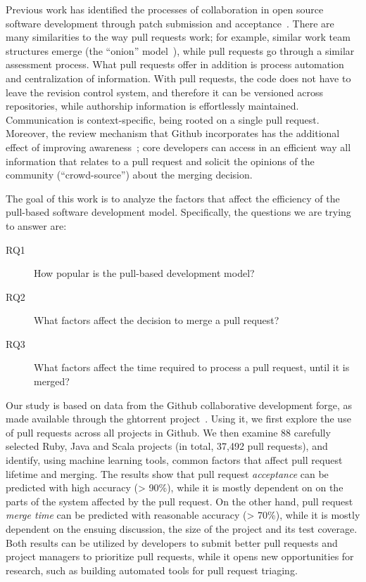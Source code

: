 \documentclass{acm_proc_article-sp}
\begin{document}
Previous work has identified the processes of collaboration in open source
software development through patch submission and acceptance~\cite{MOCKU02,
Bird07, Weiss08}. There are many similarities to the way pull requests work; for
example, similar work team structures emerge (the ``onion''
model~\cite{Crows05}), while pull requests go through a similar assessment
process. What pull requests offer in addition is process automation and
centralization of information. With pull requests, the code does not have to
leave the revision control system, and therefore it can be versioned across
repositories, while authorship information is effortlessly maintained.
Communication is context-specific, being rooted on a single pull request.
Moreover, the review mechanism that Github incorporates has the additional
effect of improving awareness~\cite{Dabbi12}; core developers can access in an
efficient way all information that relates to a pull request and solicit the
opinions of the community (``crowd-source'') about the merging decision.

The goal of this work is to analyze the factors that affect the efficiency
of the pull-based software development model. Specifically, the questions we are trying to answer are: 

\begin{description}

  \item[RQ1] How popular is the pull-based development model?

  \item[RQ2] What factors affect the decision to merge a pull request?

  \item[RQ3] What factors affect the time required to process a pull request,
    until it is merged?

\end{description}

Our study is based on data from the Github collaborative development forge, as
made available through the {\sc ght}orrent project~\cite{GS12}. Using it, we first
explore the use of pull requests across all projects in Github. We then examine
88 carefully selected Ruby, Java and Scala projects (in total, 37,492 pull requests), and
identify, using machine learning tools, common factors that affect pull request
lifetime and merging. The results show that pull request \emph{acceptance}
can be predicted with high accuracy (> 90\%), while it is mostly dependent on
on the parts of the system affected by the pull request. On the other hand, pull
request \emph{merge time} can be predicted with reasonable accuracy (> 70\%),
while it is mostly dependent on the ensuing discussion, the size of the project
and its test coverage. Both results can be utilized by developers to
submit better pull requests and project managers to prioritize pull requests, while
it opens new opportunities for research, such as building automated tools for
pull request triaging.
\end{document}
